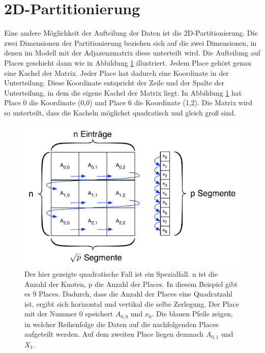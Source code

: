 
\section{2D-Partitionierung} %
\label{sec:2d_partitionierung}

Eine andere Möglichkeit der Aufteilung der Daten ist die 2D-Partitionierung. Die zwei Dimensionen der Partitionierung beziehen sich auf die zwei Dimensionen, in denen im Modell mit der Adjazenzmatrix diese unterteilt wird. Die Aufteilung auf Places geschieht dann wie in Abbildung \ref{img:2d-decomposition} illustriert. Jedem Place gehört genau eine Kachel der Matrix. Jeder Place hat dadurch eine Koordinate in der Unterteilung. Diese Koordinate entspricht der Zeile und der Spalte der Unterteilung, in dem die eigene Kachel der Matrix liegt. In Abbildung \ref{img:2d-decomposition} hat Place 0 die Koordinate (0,0) und Place 6 die Koordinate (1,2). Die Matrix wird so unterteilt, dass die Kacheln möglichst quadratisch und gleich groß sind.

\begin{figure}[h]
\centering
	\includegraphics{pics/2d-decomposition.pdf}
	\caption{Der hier gezeigte quadratische Fall ist ein Spezialfall. n ist die Anzahl der Knoten, p die Anzahl der Places. In diesem Beispiel gibt es 9 Places. Dadurch, dass die Anzahl der Places eine Quadratzahl ist, ergibt sich horizontal und vertikal die selbe Zerlegung. Der Place mit der Nummer 0 speichert $A_{0,0}$ und $x_0$. Die blauen Pfeile zeigen, in welcher Reihenfolge die Daten auf die nachfolgenden Places aufgeteilt werden. Auf dem zweiten Place liegen demnach $A_{0,1}$ und $X_1$.}
	\label{img:2d-decomposition}
\end{figure}

